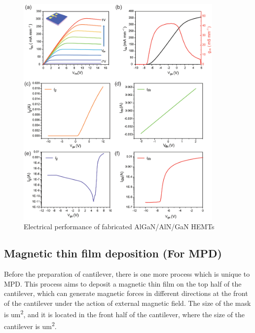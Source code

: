 \begin{figure}[H] 
\centering    
\includegraphics[width=0.9\textwidth]{performancehemt}
\caption[Electrical performance of fabricated AlGaN/AlN/GaN HEMTs]{Electrical performance of fabricated AlGaN/AlN/GaN HEMTs}
\label{fig:performancehemt}
\end{figure}



\subsection{Magnetic thin film deposition (For MPD)}

Before  the  preparation of cantilever, there is one more process which is unique to  MPD. This process aims to deposit a magnetic  thin film  on the top half  of the cantilever, which can generate magnetic forces in different directions at the front of the cantilever under the action of external  magnetic field. The size of the mask is  \unit{um^2}, and it is located in the front half of the cantilever, where the size of the cantilever is  \unit{um^2}. 

